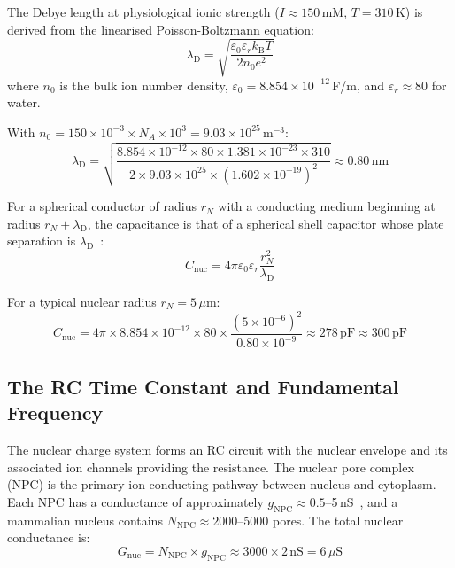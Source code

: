 \documentclass[11pt,twocolumn,a4paper]{article}
\theoremstyle{definition}
\theoremstyle{remark}
\newcommand{\kB}{k_{\mathrm{B}}}
\newcommand{\lD}{\lambda_{\mathrm{D}}}
\newcommand{\eps}{\varepsilon}
\newcommand{\epsz}{\varepsilon_{0}}
\begin{document}
The Debye length at physiological ionic strength ($I \approx 150$\,mM, $T = 310$\,K) is derived from the linearised Poisson-Boltzmann equation:
\begin{equation}
  \lD = \sqrt{\frac{\epsz \eps_r \kB T}{2 n_0 e^2}}
  \label{eq:debye_length}
\end{equation}
where $n_0$ is the bulk ion number density, $\epsz = 8.854 \times 10^{-12}$\,F/m, and $\eps_r \approx 80$ for water.

With $n_0 = 150 \times 10^{-3} \times N_A \times 10^3 = 9.03 \times 10^{25}$\,m$^{-3}$:
\begin{equation}
  \lD = \sqrt{\frac{8.854 \times 10^{-12} \times 80 \times 1.381 \times 10^{-23} \times 310}{2 \times 9.03 \times 10^{25} \times (1.602 \times 10^{-19})^2}} \approx 0.80\,\mathrm{nm}
  \label{eq:debye_numerical}
\end{equation}

For a spherical conductor of radius $r_N$ with a conducting medium beginning at radius $r_N + \lD$, the capacitance is that of a spherical shell capacitor whose plate separation is $\lD$~\cite{Griffiths1999}:
\begin{equation}
  C_{\mathrm{nuc}} = 4\pi \epsz \eps_r \frac{r_N^2}{\lD}
  \label{eq:nuclear_capacitance}
\end{equation}

For a typical nuclear radius $r_N = 5\,\mu$m:
\begin{equation}
  C_{\mathrm{nuc}} = 4\pi \times 8.854 \times 10^{-12} \times 80 \times \frac{(5 \times 10^{-6})^2}{0.80 \times 10^{-9}} \approx 278\,\mathrm{pF} \approx 300\,\mathrm{pF}
  \label{eq:nuclear_cap_numerical}
\end{equation}

\subsection{The RC Time Constant and Fundamental Frequency}

The nuclear charge system forms an RC circuit with the nuclear envelope and its associated ion channels providing the resistance. The nuclear pore complex (NPC) is the primary ion-conducting pathway between nucleus and cytoplasm. Each NPC has a conductance of approximately $g_{\mathrm{NPC}} \approx 0.5$--5\,nS~\cite{Bustamante2000,Shahin2001}, and a mammalian nucleus contains $N_{\mathrm{NPC}} \approx 2000$--5000 pores. The total nuclear conductance is:
\begin{equation}
  G_{\mathrm{nuc}} = N_{\mathrm{NPC}} \times g_{\mathrm{NPC}} \approx 3000 \times 2\,\mathrm{nS} = 6\,\mu\mathrm{S}
\end{equation}
\end{document}
